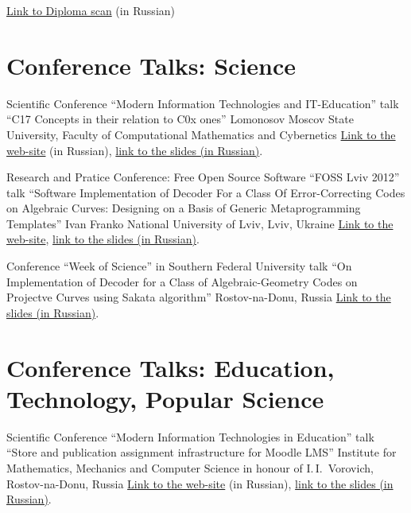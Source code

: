 \documentclass[11pt,a4paper]{moderncv}   %
\newcommand{\CPP}
{C\nolinebreak[4]\hspace{-.05em}\raisebox{.35ex}{\scriptsize\bfseries +\hspace{-.05em}+}}
\newcommand{\myhref}[2]{\textcolor{blue}{\href{#1}{#2}}}
\begin{document}
{\myhref%
{http://mmcs.sfedu.ru/~ulysses/Papers/Talks/2008-SFedU-SciWeek-diploma.jpg}
{Link to Diploma scan} (in Russian)}

\section{Conference Talks: Science}

%
    {Scientific Conference “Modern Information Technologies and IT-Education”}%
    {talk “\protect\CPP{}17 Concepts in their relation to \protect\CPP{}0x ones”}
    {Lomonosov Moscov State University, Faculty of Computational Mathematics and Cybernetics}{}%
    {\myhref{http://conf.it-edu.ru/conference/2015/programm}{Link to the web-site} (in Russian),
\myhref{http://staff.mmcs.sfedu.ru/~ulysses/Papers/Talks/2015-SITITO-Cpp1z-concepts.pdf}{link to the slides (in Russian)}.}

%
    {Research and Pratice Conference: Free Open Source Software “FOSS Lviv 2012”}%
    {talk “Software Implementation of Decoder For a Class Of Error-Correcting Codes on Algebraic Curves: Designing on a Basis of Generic Metaprogramming Templates”}%
    {Ivan Franko National University of Lviv, Lviv, Ukraine}{}%
    {\myhref{http://conference.linux.lviv.ua/en/main}{Link to the web-site},
\myhref{http://mmcs.sfedu.ru/~ulysses/Papers/Talks/2012-FOSS-Lviv.pdf}{link to the slides (in Russian)}.}

%
    {Conference “Week of Science” in Southern Federal University}%
    {talk “On Implementation of Decoder for a Class of Algebraic-Geometry Codes on Projectve Curves using Sakata algorithm”}%
    {Rostov-na-Donu, Russia}{}%
    {\myhref{http://mmcs.sfedu.ru/~ulysses/Papers/Talks/2008-SFedU-SciWeek-slides.pdf}{Link to the slides (in Russian)}.}

\section{Conference Talks: Education, Technology, Popular Science}

%
    {Scientific Conference “Modern Information Technologies in Education”}%
    {talk “Store and publication assignment infrastructure for Moodle LMS”}
    {Institute for Mathematics, Mechanics and Computer Science in honour of I.\,I.~Vorovich, Rostov-na-Donu, Russia}{}%
    {\myhref{http://inftech.uginfo.sfedu.ru/}{Link to the web-site} (in Russian),
\myhref{http://staff.mmcs.sfedu.ru/~ulysses/Papers/Talks/2015-SITO-Moodle-publication.pdf}{link to the slides (in Russian)}.}
\end{document}
